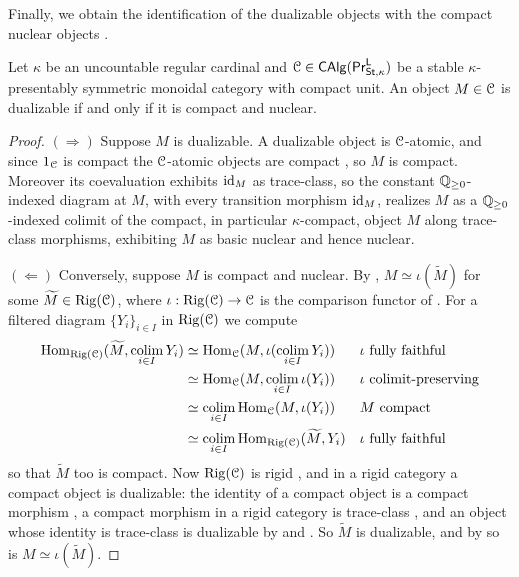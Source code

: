 Finally, we obtain the identification of the dualizable objects with the compact nuclear objects \cite[Prop. 9.3]{Complex}.
\begin{proposition}\label{prop: dualizable iff nuclear and compact category}
    Let $\kappa$ be an uncountable regular cardinal and $\EuScript{C}\in\mathsf{CAlg}(\mathsf{Pr}^{\mathsf{L}}_{\mathsf{St},\kappa})$ be a stable $\kappa$-presentably symmetric monoidal category with compact unit. An object $M\in\EuScript{C}$ is dualizable if and only if it is compact and nuclear.
\end{proposition}
\begin{proof}
    $(\Rightarrow)$ Suppose $M$ is dualizable. A dualizable object is $\EuScript{C}$-atomic, and since $1_{\EuScript{C}}$ is compact the $\EuScript{C}$-atomic objects are compact \cite[Ex. 1.23 \& Cor. 1.26]{RamziDualizable}, so $M$ is compact. Moreover its coevaluation exhibits $\mathrm{id}_{M}$ as trace-class, so the constant $\mathbb{Q}_{\geq0}$-indexed diagram at $M$, with every transition morphism $\mathrm{id}_{M}$, realizes $M$ as a $\mathbb{Q}_{\geq0}$-indexed colimit of the compact, in particular $\kappa$-compact, object $M$ along trace-class morphisms, exhibiting $M$ as basic nuclear and hence nuclear. 

    $(\Leftarrow)$ Conversely, suppose $M$ is compact and nuclear. By , $M\simeq\iota(\widetilde{M})$ for some $\widetilde{M}\in\mathrm{Rig}(\EuScript{C})$, where $\iota:\mathrm{Rig}(\EuScript{C})\to\EuScript{C}$ is the comparison functor of . For a filtered diagram $\{Y_{i}\}_{i\in I}$ in $\mathrm{Rig}(\EuScript{C})$ we compute
    \begin{align*}
        \mathrm{Hom}_{\mathrm{Rig}(\EuScript{C})}(\widetilde{M},\operatorname*{colim}_{i\in I}Y_{i}) &\simeq \mathrm{Hom}_{\EuScript{C}}(M,\iota(\operatorname*{colim}_{i\in I}Y_{i})) && \iota \text{ fully faithful}\\
        &\simeq \mathrm{Hom}_{\EuScript{C}}(M,\operatorname*{colim}_{i\in I}\iota(Y_{i})) && \iota \text{ colimit-preserving}\\
        &\simeq \operatorname*{colim}_{i\in I}\mathrm{Hom}_{\EuScript{C}}(M,\iota(Y_{i})) && M \text{ compact}\\
        &\simeq \operatorname*{colim}_{i\in I}\mathrm{Hom}_{\mathrm{Rig}(\EuScript{C})}(\widetilde{M},Y_{i}) && \iota \text{ fully faithful}
    \end{align*}
    so that $\widetilde{M}$ too is compact. Now $\mathrm{Rig}(\EuScript{C})$ is rigid \cite[Thm. 4.81]{RamziLocRigid}, and in a rigid category a compact object is dualizable: the identity of a compact object is a compact morphism \cite[Ex. 3.7]{AokiSchwartz}, a compact morphism in a rigid category is trace-class \cite[Prop. 7.17]{AokiSchwartz}, and an object whose identity is trace-class is dualizable by \cite[Ex. 2.9 \& 2.15]{RamziLocRigid} and \cite[Ex. 1.23]{RamziDualizable}. So $\widetilde{M}$ is dualizable, and by  so is $M\simeq\iota(\widetilde{M})$.
\end{proof}
